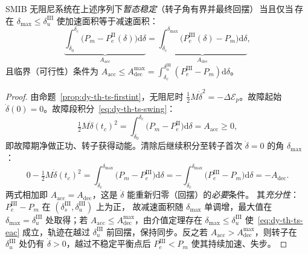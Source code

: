 \begin{theorem}[等面积定则]\label{thm:dy-th-ts-eac}
SMIB 无阻尼系统在上述序列下\emph{暂态稳定}（转子角有界并最终回摆）\,当且仅当\,存在
$\delta_{\max}\le\delta_u^{\mathrm{III}}$ 使加速面积等于减速面积：
\begin{equation}
 \underbrace{\int_{\delta_0}^{\delta_c}\!\bigl(P_m-P_e^{\mathrm{II}}(\delta)\bigr)\mathrm d\delta}_{A_{\mathrm{acc}}}
 =\underbrace{\int_{\delta_c}^{\delta_{\max}}\!\bigl(P_e^{\mathrm{III}}(\delta)-P_m\bigr)\mathrm d\delta}_{A_{\mathrm{dec}}},
 \label{eq:dy-th-ts-eac}
\end{equation}
且临界（可行性）条件为 $A_{\mathrm{acc}}\le A_{\mathrm{dec}}^{\max}
=\int_{\delta_c}^{\delta_u^{\mathrm{III}}}(P_e^{\mathrm{III}}-P_m)\mathrm d\delta$。
\end{theorem}

\begin{proof}
由命题~\ref{prop:dy-th-ts-firstint}，无阻尼时 $\tfrac12M\dot\delta^2=-\Delta\mathcal E_p$。故障起始
$\dot\delta(0)=0$。故障段积分~\eqref{eq:dy-th-ts-swing}：
\begin{equation*}
 \tfrac12M\dot\delta(t_c)^2=\int_{\delta_0}^{\delta_c}\bigl(P_m-P_e^{\mathrm{II}}\bigr)\mathrm d\delta=A_{\mathrm{acc}}\ge0,
\end{equation*}
即故障期净做正功、转子获得动能。清除后继续积分至转子首次 $\dot\delta=0$ 的角 $\delta_{\max}$：
\begin{equation*}
 0-\tfrac12M\dot\delta(t_c)^2=\int_{\delta_c}^{\delta_{\max}}\bigl(P_m-P_e^{\mathrm{III}}\bigr)\mathrm d\delta
 =-\int_{\delta_c}^{\delta_{\max}}\bigl(P_e^{\mathrm{III}}-P_m\bigr)\mathrm d\delta=-A_{\mathrm{dec}}.
\end{equation*}
两式相加即 $A_{\mathrm{acc}}=A_{\mathrm{dec}}$，这是 $\dot\delta$ 能重新归零（回摆）的\emph{必要}条件。
其\emph{充分性}：$P_e^{\mathrm{III}}-P_m$ 在 $(\delta_s^{\mathrm{III}},\delta_u^{\mathrm{III}})$ 上为正，
故减速面积随 $\delta_{\max}$ 单调增，最大值在 $\delta_{\max}=\delta_u^{\mathrm{III}}$ 处取得；若
$A_{\mathrm{acc}}\le A_{\mathrm{dec}}^{\max}$，由介值定理存在 $\delta_{\max}\le\delta_u^{\mathrm{III}}$
使~\eqref{eq:dy-th-ts-eac} 成立，轨迹在越过 $\delta_u^{\mathrm{III}}$ 前回摆，保持同步。反之若
$A_{\mathrm{acc}}>A_{\mathrm{dec}}^{\max}$，则转子在 $\delta_u^{\mathrm{III}}$ 处仍有
$\dot\delta>0$，越过不稳定平衡点后 $P_e^{\mathrm{III}}<P_m$ 使其持续加速、失步。
\end{proof}

